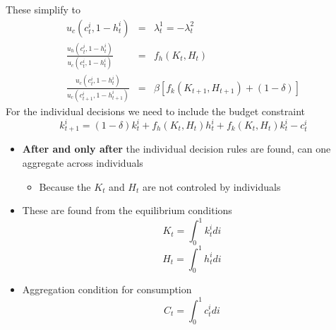 \documentclass[notes=show]{beamer}
\begin{document}
\begin{frame}%


These simplify to 
\begin{eqnarray*}
u_{c}\left( c_{t}^{i},1-h_{t}^{i}\right) &=&\lambda _{t}^{1}=-\lambda
_{t}^{2} \\
\frac{u_{h}\left( c_{t}^{i},1-h_{t}^{i}\right) }{u_{c}\left(
c_{t}^{i},1-h_{t}^{i}\right) } &=&f_{h}\left( K_{t},H_{t}\right) \\
\frac{u_{c}\left( c_{t}^{i},1-h_{t}^{i}\right) }{u_{c}\left(
c_{t+1}^{i},1-h_{t+1}^{i}\right) } &=&\beta \left[ f_{k}\left(
K_{t+1},H_{t+1}\right) +\left( 1-\delta \right) \right]
\end{eqnarray*}%
For the individual decisions we need to include the budget constraint 
\[
k_{t+1}^{i}=\left( 1-\delta \right) k_{t}^{i}+f_{h}\left( K_{t},H_{t}\right)
h_{t}^{i}+f_{k}\left( K_{t},H_{t}\right) k_{t}^{i}-c_{t}^{i} 
\]

\end{frame}%

\begin{frame}%


\begin{itemize}
\item \textbf{After and only after} the individual decision rules are found,
can one aggregate across individuals

\begin{itemize}
\item Because the $K_{t}$ and $H_{t}$ are not controled by individuals
\end{itemize}

\item These are found from the equilibrium conditions%
\[
K_{t}=\int_{0}^{1}k_{t}^{i}di 
\]%
\[
H_{t}=\int_{0}^{1}h_{t}^{i}di 
\]

\item Aggregation condition for consumption%
\[
C_{t}=\int_{0}^{1}c_{t}^{i}di 
\]
\end{itemize}

\end{frame}%
\end{document}
